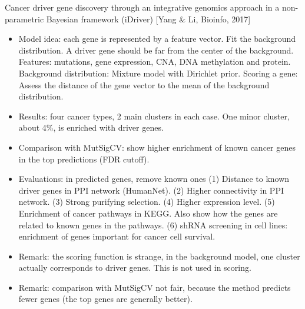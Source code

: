 \documentclass{report}
\begin{document}
Cancer driver gene discovery through an integrative genomics approach in a non-parametric Bayesian framework (iDriver) [Yang \& Li, Bioinfo, 2017]
\begin{itemize}
	
	\item Model idea: each gene is represented by a feature vector. Fit the background distribution. A driver gene should be far from the center of the background. Features: mutations, gene expression, CNA, DNA methylation and protein. Background distribution: Mixture model with Dirichlet prior. Scoring a gene: Assess the distance of the gene vector to the mean of the background distribution.
	
	\item Results: four cancer types, 2 main clusters in each case. One minor cluster, about 4\%, is enriched with driver genes.
	
	\item Comparison with MutSigCV: show higher enrichment of known cancer genes in the top predictions (FDR cutoff).
	
	\item Evaluations: in predicted genes, remove known ones (1) Distance to known driver genes in PPI network (HumanNet). (2) Higher connectivity in PPI network. (3) Strong purifying selection. (4) Higher expression level. (5) Enrichment of cancer pathways in KEGG. Also show how the genes are related to known genes in the pathways. (6) shRNA screening in cell lines: enrichment of genes important for cancer cell survival.
	
	\item Remark: the scoring function is strange, in the background model, one cluster actually corresponds to driver genes. This is not used in scoring.
	
	\item Remark: comparison with MutSigCV not fair, because the method predicts fewer genes (the top genes are generally better).
\end{itemize}
\end{document}
